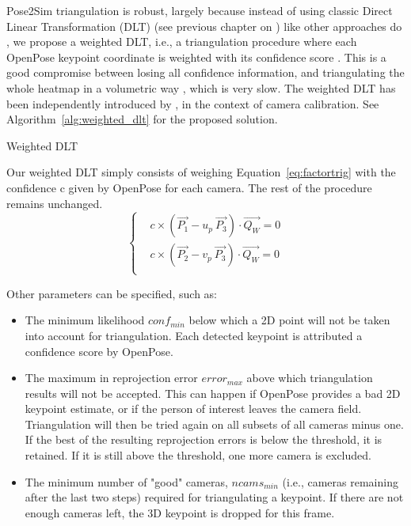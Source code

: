Pose2Sim triangulation is robust, largely because instead of using classic Direct Linear Transformation (DLT) (see previous chapter on ) like other approaches do \cite{Hidalgo2021,Matthis2022,Sheshadri2020,Easymocap2021}, we propose a weighted DLT, i.e., a triangulation procedure where each OpenPose keypoint coordinate is weighted with its confidence score \cite{Pagnon2021}. This is a good compromise between losing all confidence information, and triangulating the whole heatmap in a volumetric way \cite{Iskakov2019}, which is very slow. The weighted DLT has been independently introduced by \cite{Barone2020}, in the context of camera calibration. See Algorithm~\ref{alg:weighted_dlt} for the proposed solution. 

\begin{algorithm}[!ht]
      \caption{Weighted DLT}\label{alg:weighted_dlt}
      \begin{algorithmic}[1]
            \STATEx Our weighted DLT simply consists of weighing Equation~\ref{eq:factortrig} with the confidence c given by OpenPose for each camera. The rest of the procedure remains unchanged.
            \begin{equation}
                  \begin{cases}
                        &  c \times (\overrightarrow{P_1} - u_p \ \overrightarrow{P_3} ) \cdot \overrightarrow{Q_W}  = 0\\
                        &  c \times (\overrightarrow{P_2} - v_p \ \overrightarrow{P_3} ) \cdot \overrightarrow{Q_W}  = 0\\
                  \end{cases}
          \end{equation}
      \end{algorithmic}
\end{algorithm}

Other parameters can be specified, such as:
\begin{itemize}[itemsep=0em, topsep=0em, leftmargin=*]
      \item The minimum likelihood \(conf_{min}\) below which a 2D point will not be taken into account for triangulation. Each detected keypoint is attributed a confidence score by OpenPose.
      \item The maximum in reprojection error \(error_{max}\) above which triangulation results will not be accepted. This can happen if OpenPose provides a bad 2D keypoint estimate, or if the person of interest leaves the camera field. Triangulation will then be tried again on all subsets of all cameras minus one. If the best of the resulting reprojection errors is below the threshold, it is retained. If it is still above the threshold, one more camera is excluded.
      \item The minimum number of "good" cameras, \(ncams_{min}\) (i.e., cameras remaining after the last two steps) required for triangulating a keypoint. If there are not enough cameras left, the 3D keypoint is dropped for this frame.
\end{itemize}

